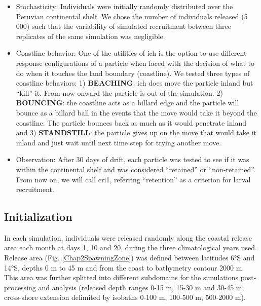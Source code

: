 \begin{itemize}

\item Stochasticity: Individuals were initially randomly distributed over the Peruvian continental shelf. We chose the number of individuals released (5 000) such that the variability of simulated recruitment between three replicates of the same simulation was negligible.\\

\item Coastline behavior: One of the utilities of \gls{ich} is the option to use different response configurations of a particle when faced with the decision of what to do when it touches the land boundary (coastline). We tested three types of coastline behaviors: 1) \textbf{BEACHING}: \gls{ich} does move the particle inland but ``kill'' it. From now onward the particle is out of the simulation. 2) \textbf{BOUNCING}: the coastline acts as a billard edge and the particle will bounce as a billard ball in the events that the move would take it beyond the coastline. The particle bounces back as much as it would penetrate inland and 3) \textbf{STANDSTILL}: the particle gives up on the move that would take it inland and just wait until next time step for trying another move.\\

\item Observation: After 30 days of drift, each particle was tested to see if it was within the continental shelf and was considered ``retained'' or ``non-retained''. From now on, we will call \gls{cri1}, referring ``retention'' as a criterion for larval recruitment.\\

\end{itemize}

\subsection{Initialization}\label{Chap2MethInit}

In each simulation, individuals were released randomly along the coastal release area each month at days 1, 10 and 20, during the three climatological years used.\\

Release area (Fig. \ref{Chap2SpawningZone}) was defined between latitudes 6°S and 14°S, depths 0 m to 45 m and from the coast to bathymetry contour 2000 m. This area was further splitted into different subdomains for the simulations post-processing and analysis (released depth ranges 0-15 m, 15-30 m and 30-45 m; cross-shore extension delimited by isobaths 0-100 m, 100-500 m, 500-2000 m).\\

